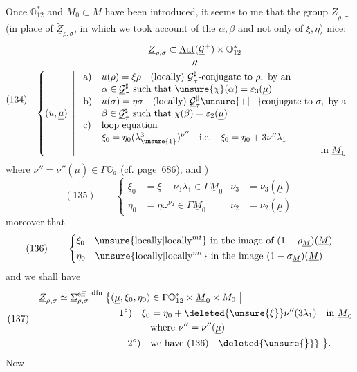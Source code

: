 Once \(\mathbb O_{12}^{*}\) and \(M_0\subset M\) have been introduced, it
seems to me that the group \(\underline Z_{\rho,\sigma}\) (in place
of \(\underline{\widetilde Z}_{\rho,\sigma}\), in which we took
account of the \(\alpha,\beta\) and not only
of \(\xi,\eta\))  nice:
\[
(134)\quad
\begin{gathered}
\underline Z_{\rho,\sigma}\subset
\underline{\operatorname{Aut}}(\underline{\mathcal G}^{+})\times\mathbb O_{12}^{*}
\\[-2pt]
\text{\(\prime\prime\)}\\[-2pt]
\left\{(u,\underline\mu)\ \left|\
\begin{array}{ll}
\text{a)}&u(\rho)=\xi\rho\quad\text{(locally) }\underline{\mathcal G}_{\tau}^{\sharp}\text{-conjugate to }\rho,\text{ by an}\\
&\alpha\in\underline{\mathcal G}_{\tau}^{\sharp}\text{ such that }\unsure{\chi}(\alpha)=\varepsilon_3(\underline\mu)\\
\text{b)}&u(\sigma)=\eta\sigma\quad\text{(locally) }\underline{\mathcal G}_{\tau}^{\sharp}\unsure{+|-}\text{conjugate to }\sigma,\text{ by a}\\
&\beta\in\underline{\mathcal G}_{\tau}^{\sharp}\text{ such that }\chi(\beta)=\varepsilon_2(\underline\mu)\\
\text{c)}&\text{loop equation}\\
&\xi_0=\eta_0(\lambda_{\unsure{1}}^3)^{\nu''}\quad\text{i.e.}\quad\xi_0=\eta_0+3\nu''\lambda_1\\
&\hfill\text{in }\underline M_0
\end{array}\right.\right.
\end{gathered}
\]
where \(\nu''=\nu''(\underline\mu)\in\Gamma\mathbb G_a\)
(cf.  page~686), and )
\[
(135)\qquad
\left\{\begin{aligned}
\xi_0&=\xi-\nu_3\lambda_1\in\Gamma\underline M_0
&\nu_3&=\nu_3(\underline\mu)\\
\eta_0&=\eta\omega^{\nu_2}\in\Gamma\underline M_0
&\nu_2&=\nu_2(\underline\mu)
\end{aligned}\right.
\]
   moreover that
\[
(136)\qquad
\left\{\begin{aligned}
&\xi_0\quad\text{\unsure{locally|locally\(^{mt}\)} in the image of }(1-\rho_{\underline M})(\underline M)\\
&\eta_0\quad\text{\unsure{locally|locally\(^{mt}\)} in the image }(1-\sigma_{\underline M})(\underline M)
\end{aligned}\right.
\]
and we shall have
\[
(137)\quad
\begin{aligned}
\underline Z_{\rho,\sigma}\simeq\underline\Sigma_{\rho,\sigma}^{\mathrm{eff}}
\overset{\mathrm{dfn}}{=}
\bigl\{(\underline\mu,\xi_0,\eta_0)&\in\Gamma\mathbb O_{12}^{*}\times\underline M_0\times M_0\ \big|\\
1^\circ)\quad\xi_0&=\eta_0+\deleted{\unsure{\xi}}\nu''(3\lambda_1)\quad\text{in }\underline M_0\\
&\text{where }\nu''=\nu''(\underline\mu)\\
2^\circ)\quad&\text{we have }(136)\quad\deleted{\unsure{\bigr\}}}\ \bigr\}.
\end{aligned}
\]
Now

